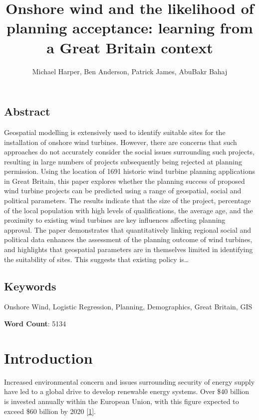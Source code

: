 \documentclass[a4paper,]{article}
\title{Onshore wind and the likelihood of planning acceptance: learning from a
Great Britain context}
\author{Michael Harper, Ben Anderson, Patrick James, AbuBakr Bahaj}
\date{}
\theoremstyle{definition}
\theoremstyle{definition}
\theoremstyle{definition}
\theoremstyle{remark}
\begin{document}
\maketitle

\subsection*{Abstract}\label{abstract}

Geospatial modelling is extensively used to identify suitable sites for
the installation of onshore wind turbines. However, there are concerns
that such approaches do not accurately consider the social issues
surrounding such projects, resulting in large numbers of projects
subsequently being rejected at planning permission. Using the location
of 1691 historic wind turbine planning applications in Great Britain,
this paper explores whether the planning success of proposed wind
turbine projects can be predicted using a range of geospatial, social
and political parameters. The results indicate that the size of the
project, percentage of the local population with high levels of
qualifications, the average age, and the proximity to existing wind
turbines are key influences affecting planning approval. The paper
demonstrates that quantitatively linking regional social and political
data enhances the assessment of the planning outcome of wind turbines,
and highlights that geospatial parameters are in themselves limited in
identifying the suitability of sites. This suggests that existing policy
is\ldots{}

\subsection*{Keywords}\label{keywords}

Onshore Wind, Logistic Regression, Planning, Demographics, Great
Britain, GIS

\textbf{Word Count}: 5134

\section{Introduction}\label{introduction}

Increased environmental concern and issues surrounding security of
energy supply have led to a global drive to develop renewable energy
systems. Over \$40 billion is invested annually within the European
Union, with this figure expected to exceed \$60 billion by 2020
{[}\protect\hyperlink{ref-UNEP2016}{1}{]}.
\end{document}
